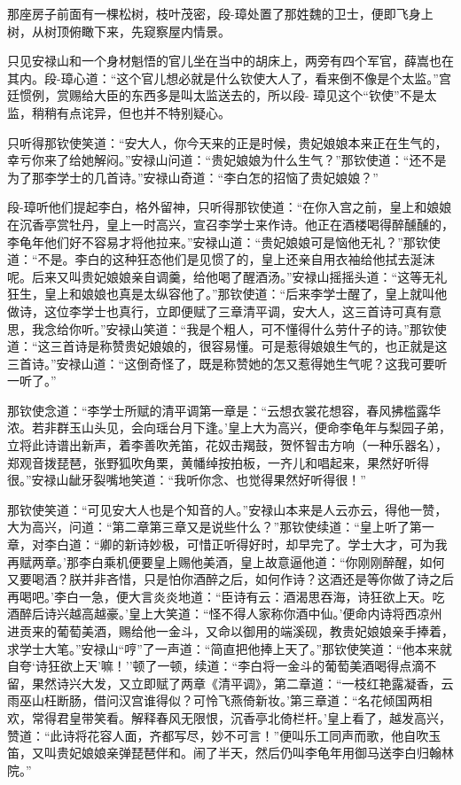 \documentclass[12pt,oneside]{book}
\begin{document}
那座房子前面有一棵松树，枝叶茂密，段-璋处置了那姓魏的卫士，便即飞身上树，从树顶俯瞰下来，先窥察屋内情景。

只见安禄山和一个身材魁悟的官儿坐在当中的胡床上，两旁有四个军官，薛嵩也在其内。段-璋心道：``这个官儿想必就是什么钦使大人了，看来倒不像是个太监。''宫廷惯例，赏赐给大臣的东西多是叫太监送去的，所以段-
璋见这个``钦使''不是太监，稍稍有点诧异，但也并不特别疑心。

只听得那钦使笑道：``安大人，你今天来的正是时候，贵妃娘娘本来正在生气的，幸亏你来了给她解闷。''安禄山问道：``贵妃娘娘为什么生气？''那钦使道：``还不是为了那李学士的几首诗。''安禄山奇道：``李白怎的招恼了贵妃娘娘？''

段-璋听他们提起李白，格外留神，只听得那钦使道：``在你入宫之前，皇上和娘娘在沉香亭赏牡丹，皇上一时高兴，宣召李学士来作诗。他正在酒楼喝得醉醺醺的，李龟年他们好不容易才将他拉来。''安禄山道：``贵妃娘娘可是恼他无礼？''那钦使道：``不是。李白的这种狂态他们是见惯了的，皇上还亲自用衣袖给他拭去涎沫呢。后来又叫贵妃娘娘亲自调羹，给他喝了醒酒汤。''安禄山摇摇头道：``这等无礼狂生，皇上和娘娘也真是太纵容他了。''那钦使道：``后来李学士醒了，皇上就叫他做诗，这位李学士也真行，立即便赋了三章清平调，安大人，这三首诗可真有意思，我念给你听。''安禄山笑道：``我是个粗人，可不懂得什么劳什子的诗。''那钦使道：``这三首诗是称赞贵妃娘娘的，很容易懂。可是惹得娘娘生气的，也正就是这三首诗。''安禄山道：``这倒奇怪了，既是称赞她的怎又惹得她生气呢？这我可要听一听了。''

那钦使念道：``李学士所赋的清平调第一章是：``云想衣裳花想容，春风拂槛露华浓。若非群玉山头见，会向瑶台月下逢。'皇上大为高兴，便命李龟年与梨园子弟，立将此诗谱出新声，着李善吹羌笛，花奴击羯鼓，贺怀智击方响（一种乐器名），郑观音拨琵琶，张野狐吹角栗，黄幡绰按拍板，一齐儿和唱起来，果然好听得很。''安禄山龇牙裂嘴地笑道：``我听你念、也觉得果然好听得很！''

那钦使笑道：``可见安大人也是个知音的人。''安禄山本来是人云亦云，得他一赞，大为高兴，问道：``第二章第三章又是说些什么？''那钦使续道：``皇上听了第一章，对李白道：``卿的新诗妙极，可惜正听得好时，却早完了。学士大才，可为我再赋两章。'那李白乘机便要皇上赐他美酒，皇上故意逼他道：``你刚刚醉醒，如何又要喝酒？朕并非吝惜，只是怕你酒醉之后，如何作诗？这酒还是等你做了诗之后再喝吧。'李白一急，便大言炎炎地道：``臣诗有云：酒渴思吞海，诗狂欲上天。吃酒醉后诗兴越高越豪。'皇上大笑道：``怪不得人家称你酒中仙。'便命内诗将西凉州进贡来的葡萄美酒，赐给他一金斗，又命以御用的端溪砚，教贵妃娘娘亲手捧着，求学士大笔。''安禄山``哼''了一声道：``简直把他捧上天了。''那钦使笑道：``他本来就自夸`诗狂欲上天'嘛！''顿了一顿，续道：``李白将一金斗的葡萄美酒喝得点滴不留，果然诗兴大发，又立即赋了两章《清平调》，第二章道：``一枝红艳露凝香，云雨巫山枉断肠，借问汉宫谁得似？可怜飞燕倚新妆。'第三章道：``名花倾国两相欢，常得君皇带笑看。解释春风无限恨，沉香亭北倚栏杆。'皇上看了，越发高兴，赞道：``此诗将花容人面，齐都写尽，妙不可言！''便叫乐工同声而歌，他自吹玉笛，又叫贵妃娘娘亲弹琵琶伴和。闹了半天，然后仍叫李龟年用御马送李白归翰林院。''
\end{document}
